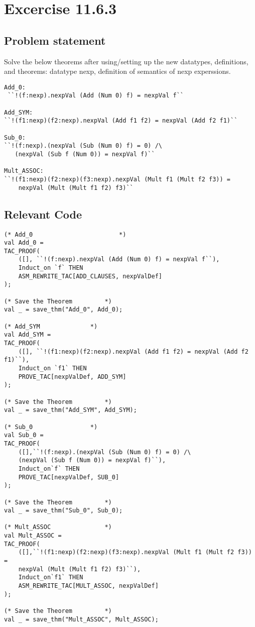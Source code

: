 \documentclass{report}
\begin{document}
\chapter{Excercise 11.6.3}
\label{cha:11-6-3}

\section{Problem statement}
\label{problem-statement-11-6-3}
Solve the below theorems after using/setting up the new datatypes,
definitions, and theorems: datatype nexp, definition of semantics of
nexp experssions.
\begin{lstlisting}[frame=tblr]
Add_0:
 ``!(f:nexp).nexpVal (Add (Num 0) f) = nexpVal f``

Add_SYM:
``!(f1:nexp)(f2:nexp).nexpVal (Add f1 f2) = nexpVal (Add f2 f1)``

Sub_0:
``!(f:nexp).(nexpVal (Sub (Num 0) f) = 0) /\ 
   (nexpVal (Sub f (Num 0)) = nexpVal f)``

Mult_ASSOC:
``!(f1:nexp)(f2:nexp)(f3:nexp).nexpVal (Mult f1 (Mult f2 f3)) =
	nexpVal (Mult (Mult f1 f2) f3)``
\end{lstlisting}

\section{Relevant Code}
\label{rel-code-11-6-3}
\begin{lstlisting}[frame=TBlr]
(* Add_0   	    	     	   	*)
val Add_0 =
TAC_PROOF(
	([], ``!(f:nexp).nexpVal (Add (Num 0) f) = nexpVal f``),
	Induct_on `f` THEN
	ASM_REWRITE_TAC[ADD_CLAUSES, nexpValDef]
);

(* Save the Theorem			*)
val _ = save_thm("Add_0", Add_0);

(* Add_SYM				*)
val Add_SYM =
TAC_PROOF(
	([], ``!(f1:nexp)(f2:nexp).nexpVal (Add f1 f2) = nexpVal (Add f2 f1)``),
	Induct_on `f1` THEN
	PROVE_TAC[nexpValDef, ADD_SYM]
);

(* Save the Theorem			*)
val _ = save_thm("Add_SYM", Add_SYM);

(* Sub_0				*)
val Sub_0 =
TAC_PROOF(
	([],``!(f:nexp).(nexpVal (Sub (Num 0) f) = 0) /\
	(nexpVal (Sub f (Num 0)) = nexpVal f)``),
	Induct_on`f` THEN
	PROVE_TAC[nexpValDef, SUB_0]
);

(* Save the Theorem			*)
val _ = save_thm("Sub_0", Sub_0);

(* Mult_ASSOC				*)
val Mult_ASSOC =
TAC_PROOF(
	([],``!(f1:nexp)(f2:nexp)(f3:nexp).nexpVal (Mult f1 (Mult f2 f3)) =
	nexpVal (Mult (Mult f1 f2) f3)``),
	Induct_on`f1` THEN
	ASM_REWRITE_TAC[MULT_ASSOC, nexpValDef]
);

(* Save the Theorem			*)
val _ = save_thm("Mult_ASSOC", Mult_ASSOC);
\end{lstlisting}
\end{document}

